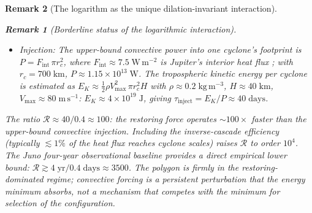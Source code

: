 \documentclass[12pt, a4paper]{article}
\newtheorem{remark}{Remark}[section]
\numberwithin{equation}{section}
\begin{document}
\begin{remark}[The logarithm as the unique dilation-invariant interaction]
\begin{remark}[Borderline status of the logarithmic interaction]
\begin{itemize}
\item \emph{Injection:} The upper-bound convective power into one
  cyclone's footprint is $P = F_{\mathrm{int}}\,\pi r_c^2$, where
  $F_{\mathrm{int}} \approx 7.5\;\mathrm{W\,m^{-2}}$ is Jupiter's
  interior heat flux \citep{Guillot2005}; with $r_c = 700\;\mathrm{km}$,
  $P \approx 1.15\times10^{13}\;\mathrm{W}$.
  The tropospheric kinetic energy per cyclone is estimated as
  $E_K \approx \tfrac{1}{2}\rho V_{\max}^2\,\pi r_c^2 H$
  with $\rho \approx 0.2\;\mathrm{kg\,m^{-3}}$, $H \approx 40\;\mathrm{km}$,
  $V_{\max} \approx 80\;\mathrm{m\,s^{-1}}$:
  $E_K \approx 4\times 10^{19}\;\mathrm{J}$, giving
  $\tau_{\mathrm{inject}} = E_K/P \approx 40\;\mathrm{days}$.
\end{itemize}
The ratio $\mathcal{R} \approx 40/0.4 \approx 100$: the restoring force
operates $\sim\!100\times$ faster than the upper-bound convective
injection.  Including the inverse-cascade efficiency (typically
$\lesssim 1\%$ of the heat flux reaches cyclone scales) raises
$\mathcal{R}$ to order $10^4$.  The Juno four-year observational
baseline provides a direct empirical lower bound:
$\mathcal{R} \gtrsim 4\;\mathrm{yr}/0.4\;\mathrm{days} \approx 3500$.
The polygon is firmly in the restoring-dominated regime; convective
forcing is a persistent perturbation that the energy minimum absorbs,
not a mechanism that competes with the minimum for selection of the
configuration.


\end{remark}
\end{remark}
\end{document}
